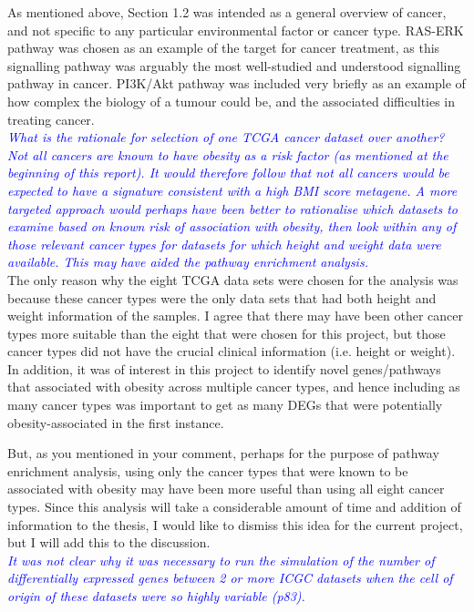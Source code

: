 \documentclass[a4paper, 12pt]{article}
\begin{document}
\noindent
As mentioned above, Section 1.2 was intended as a general overview of cancer, and not specific to any particular environmental factor or cancer type.
RAS-ERK pathway was chosen as an example of the target for cancer treatment, as this signalling pathway was arguably the most well-studied and understood signalling pathway in cancer.
PI3K/Akt pathway was included very briefly as an example of how complex the biology of a tumour could be, and the associated difficulties in treating cancer.
\\

\noindent
\textcolor{blue}{
\textit{What is the rationale for selection of one TCGA cancer dataset over another?
Not all cancers are known to have obesity as a risk factor (as mentioned at the beginning of this report).
It would therefore follow that not all cancers would be expected to have a signature consistent with a high BMI score metagene.
A more targeted approach would perhaps have been better to rationalise which datasets to examine based on known risk of association with obesity, then look within any of those relevant cancer types for datasets for which height and weight data were available.
This may have aided the pathway enrichment analysis.
}
}\\

\noindent
The only reason why the eight TCGA data sets were chosen for the analysis was because these cancer types were the only data sets that had both height and weight information of the samples.
I agree that there may have been other cancer types more suitable than the eight that were chosen for this project, but those cancer types did not have the crucial clinical information (i.e. height or weight).
In addition, it was of interest in this project to identify novel genes/pathways that associated with obesity across multiple cancer types, and hence including as many cancer types was important to get as many DEGs that were potentially obesity-associated in the first instance.

But, as you mentioned in your comment, perhaps for the purpose of pathway enrichment analysis, using only the cancer types that were known to be associated with obesity may have been more useful than using all eight cancer types.
Since this analysis will take a considerable amount of time and addition of information to the thesis, I would like to dismiss this idea for the current project, but I will add this to the discussion.
\\

\noindent
\textcolor{blue}{
\textit{It was not clear why it was necessary to run the simulation of the number of differentially expressed genes between 2 or more ICGC datasets when the cell of origin of these datasets were so highly variable (p83).
}
}\\
\end{document}
